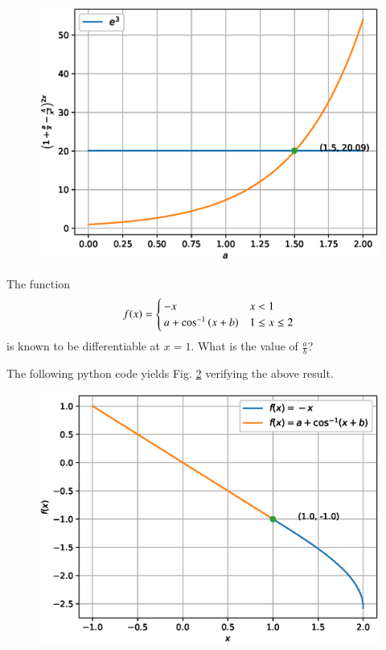 \documentclass[journal,12pt,twocolumn]{IEEEtran}
\begin{document}

\begin{figure}[!ht]
\begin{center}
\includegraphics[width=\columnwidth]{./figs/ee16b1004}
\end{center}
\label{fig_4}	
\end{figure}
\begin{problem}
The function
%
\begin{equation}
f(x)=
\begin{cases}
-x & x < 1 \\
a + \cos^{-1}\left(x + b\right) & 1 \leq x \leq 2
\end{cases}
\end{equation}
%
is known to be differentiable at $x=1$.  What is the value of $\frac{a}{b}$?
\end{problem}
\solution

The following python code yields Fig. \ref{fig_5} verifying the above result.

\begin{figure}[!ht]
\begin{center}
\includegraphics[width=\columnwidth]{./figs/ee16b1005}
\end{center}
\label{fig_5}	
\end{figure}
\end{document}
